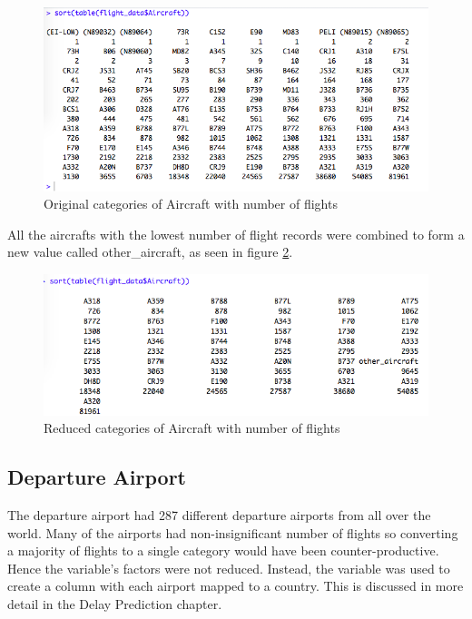 \begin{figure}[H]
    \centering
    \includegraphics[width=\textwidth]{Figures/Aircraft_orig_levels.png}
    \caption{Original categories of Aircraft with number of flights}
    \label{fig:aircraft1}
\end{figure}

All the aircrafts with the lowest number of flight records were combined to form a new value called other\_aircraft, as seen in figure \ref{fig:aircraft2}.

\begin{figure}[H]
    \centering
    \includegraphics[width=\textwidth]{Figures/Aircraft_reduced_levels.png}
    \caption{Reduced categories of Aircraft with number of flights}
    \label{fig:aircraft2}
\end{figure}

\subsection{Departure Airport}
The departure airport had 287 different departure airports from all over the world. Many of the airports had non-insignificant number of flights so converting a majority of flights to a single category would have been counter-productive. Hence the variable's factors were not reduced. Instead, the variable was used to create a column with each airport mapped to a country. This is discussed in more detail in the Delay Prediction chapter.

